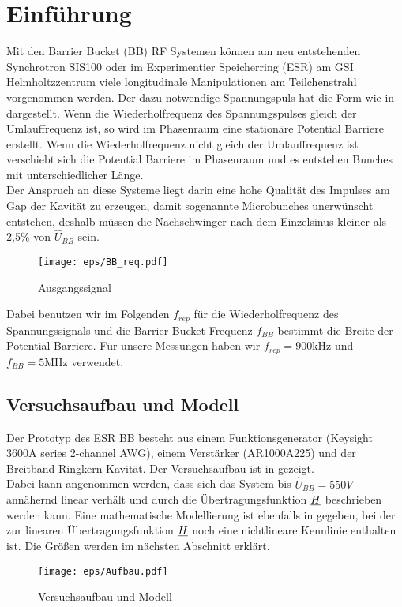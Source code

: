 \documentclass[../Report.tex]{subfiles}
\begin{document}
\chapter{Einführung}
\label{chap:einfuehrung}
Mit den Barrier Bucket (BB) RF Systemen können am neu entstehenden Synchrotron SIS100 oder im Experimentier Speicherring (ESR) am GSI Helmholtzzentrum viele longitudinale Manipulationen am Teilchenstrahl vorgenommen werden. Der dazu notwendige Spannungspuls hat die Form wie in  dargestellt. Wenn die Wiederholfrequenz des Spannungspulses gleich der Umlauffrequenz ist, so wird im Phasenraum eine stationäre Potential Barriere erstellt. Wenn die Wiederholfrequenz nicht gleich der Umlauffrequenz ist verschiebt sich die Potential Barriere im Phasenraum und es entstehen Bunches mit unterschiedlicher Länge.\\ Der Anspruch an diese Systeme liegt darin eine hohe Qualität des Impulses am Gap der Kavität zu erzeugen, damit sogenannte Microbunches unerwünscht entstehen, deshalb müssen die Nachschwinger nach dem Einzelsinus kleiner als 2,5\% von $\hat{U}_{BB}$ sein.
\begin{figure}[H]
  \centering
  \texttt{[image: eps/BB\_req.pdf]}
  \caption{Ausgangssignal}
  \label{fig:BB_req}
\end{figure}

Dabei benutzen wir im Folgenden $f_{rep}$ für die Wiederholfrequenz des Spannungssignals und die Barrier Bucket Frequenz $f_{BB}$ bestimmt die Breite der Potential Barriere. Für unsere Messungen haben wir ${f_{rep} = 900 \si{\kilo \hertz}}$ und ${f_{BB} = 5 \si{\mega \hertz}}$ verwendet.


\section[Modell und Konvention]{Versuchsaufbau und Modell}
\label{sec:einf.modell_BB}
Der Prototyp des ESR BB besteht aus einem Funktionsgenerator (Keysight 3600A series 2-channel AWG), einem Verstärker (AR1000A225) und der Breitband Ringkern Kavität. Der Versuchsaufbau ist in  gezeigt.\\Dabei kann angenommen werden, dass sich das System bis $\hat{U}_{BB} = 550V$ annähernd linear verhält und durch die Übertragungsfunktion $\underline{H}$ beschrieben werden kann. Eine mathematische Modellierung ist ebenfalls in  gegeben, bei der zur linearen Übertragungsfunktion $\underline{H}$ noch eine nichtlineare Kennlinie enthalten ist. Die Größen werden im nächsten Abschnitt erklärt.
\begin{figure}[H]
	\centering
	\texttt{[image: eps/Aufbau.pdf]}
	\caption{Versuchsaufbau und Modell}
  	\label{fig:Aufbau}
\end{figure}
\end{document}

